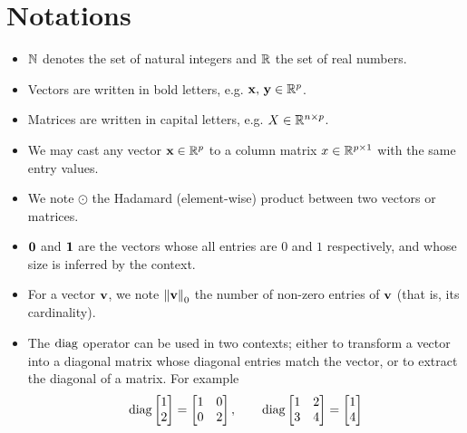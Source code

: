 \cleardoublepage
\chapter*{Notations}

\begin{itemize}
    \item $\mathbb{N}$ denotes the set of natural integers and $\mathbb{R}$ the set of real numbers.
    \item Vectors are written in bold letters, e.g. $\mathbf{x},\, \mathbf{y} \in \mathbb{R}^p$.
    \item Matrices are written in capital letters, e.g. $X \in \mathbb{R}^{n \times p}$.
    \item We may cast any vector $\mathbf{x} \in \mathbb{R}^p$ to a column matrix $x \in \mathbb{R}^{p \times 1}$ with the same entry values.
    \item We note $\odot$ the Hadamard (element-wise) product between two vectors or matrices.
    \item $\mathbf{0}$ and $\mathbf{1}$ are the vectors whose all entries are $0$ and $1$ respectively, and whose size is inferred by the context.
    \item For a vector $\mathbf{v}$, we note $\left\lVert\mathbf{v}\right\rVert_0$ the number of non-zero entries of $\mathbf{v}$ (that is, its cardinality).
    \item The $\operatorname*{diag}$ operator can be used in two contexts;
    either to transform a vector into a diagonal matrix whose diagonal entries match the vector,
    or to extract the diagonal of a matrix.
    For example
    \begin{equation*}
        \operatorname*{diag} \begin{bmatrix}
                  1\\
                  2
        \end{bmatrix}
        =
        \begin{bmatrix}
            1 & 0\\
            0 & 2
        \end{bmatrix}
        ,\qquad
        \operatorname*{diag} \begin{bmatrix}
                  1 & 2\\
                  3 & 4
        \end{bmatrix}
        =
        \begin{bmatrix}
            1\\
            4
        \end{bmatrix}
    \end{equation*}

\end{itemize}
